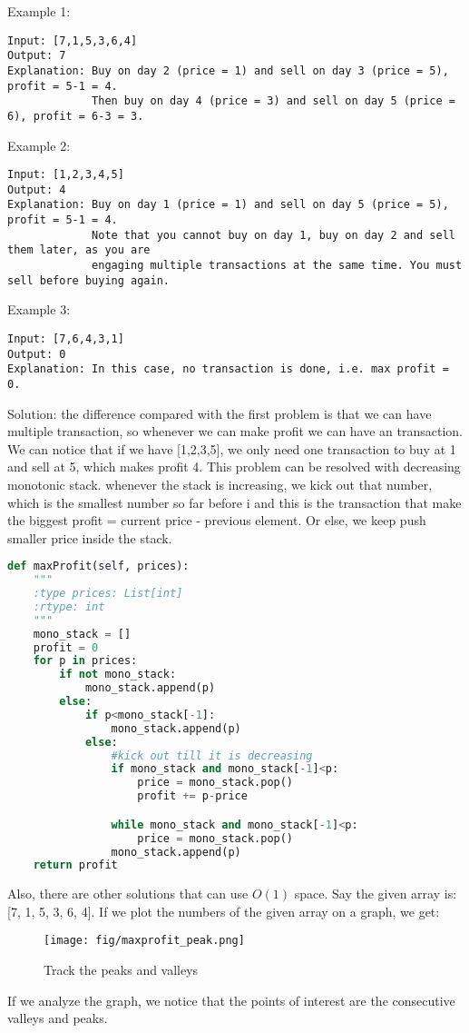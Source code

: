 \documentclass[../main.tex]{subfiles}
\begin{document}
\begin{examples}[resume]
Example 1:
\begin{lstlisting}
Input: [7,1,5,3,6,4]
Output: 7
Explanation: Buy on day 2 (price = 1) and sell on day 3 (price = 5), profit = 5-1 = 4.
             Then buy on day 4 (price = 3) and sell on day 5 (price = 6), profit = 6-3 = 3.
\end{lstlisting}
Example 2:
\begin{lstlisting}
Input: [1,2,3,4,5]
Output: 4
Explanation: Buy on day 1 (price = 1) and sell on day 5 (price = 5), profit = 5-1 = 4.
             Note that you cannot buy on day 1, buy on day 2 and sell them later, as you are
             engaging multiple transactions at the same time. You must sell before buying again.
\end{lstlisting}
Example 3:
\begin{lstlisting}
Input: [7,6,4,3,1]
Output: 0
Explanation: In this case, no transaction is done, i.e. max profit = 0.
\end{lstlisting}
Solution: the difference compared with the first problem is that we can have multiple transaction, so whenever we can make profit we can have an transaction. We can notice that if we have [1,2,3,5], we only need one transaction to buy at 1 and sell at 5, which makes profit 4.  This problem can be resolved with decreasing monotonic stack.  whenever the stack is increasing, we kick out that number, which is the smallest number so far before i and this is the transaction that make the biggest profit = current price - previous element. Or else, we keep push smaller price inside the stack. 
\begin{lstlisting}[language = Python]
def maxProfit(self, prices):
    """
    :type prices: List[int]
    :rtype: int
    """
    mono_stack = []
    profit = 0
    for p in prices:
        if not mono_stack:
            mono_stack.append(p)
        else:
            if p<mono_stack[-1]:
                mono_stack.append(p)
            else:
                #kick out till it is decreasing
                if mono_stack and mono_stack[-1]<p:
                    price = mono_stack.pop()
                    profit += p-price

                while mono_stack and mono_stack[-1]<p:
                    price = mono_stack.pop()
                mono_stack.append(p)
    return profit
\end{lstlisting}
Also, there are other solutions that can use $O(1)$ space.  Say the given array is: [7, 1, 5, 3, 6, 4]. If we plot the numbers of the given array on a graph, we get:
\begin{figure}[h]
    \centering
    \texttt{[image: fig/maxprofit\_peak.png]}
    \caption{Track the peaks and valleys}
    \label{fig:max_profit_peak_valley}
\end{figure}
If we analyze the graph, we notice that the points of interest are the consecutive valleys and peaks.


\end{examples}
\end{document}
